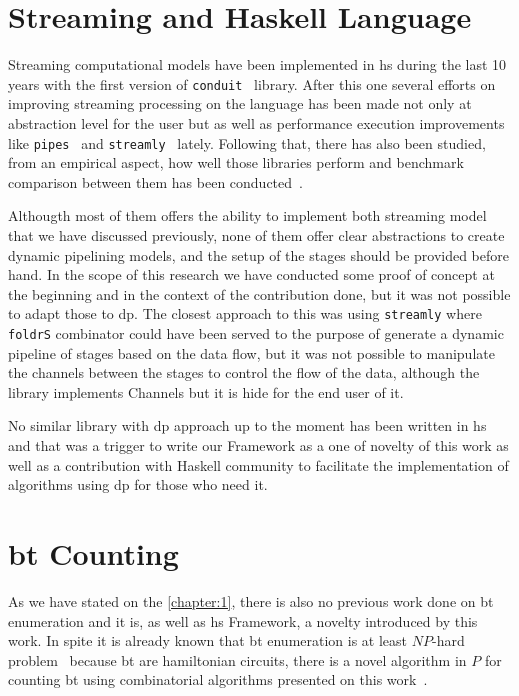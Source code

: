   

\section{Streaming and Haskell Language}
Streaming computational models have been implemented in \acrfull{hs} during the last 10 years with the first version of \texttt{conduit}~\cite{conduit} library.
After this one several efforts on improving streaming processing on the language has been made not only at abstraction level for the user but as well as performance execution 
improvements like \texttt{pipes}~\cite{pipes} and \texttt{streamly}~\cite{streamly} lately.
Following that, there has also been studied, from an empirical aspect, how well those libraries perform and benchmark comparison between them has been conducted~\cite{benchstreamhs}.

Althougth most of them offers the ability to implement both streaming model that we have discussed previously, none of them offer clear abstractions to create dynamic pipelining models, and
the setup of the stages should be provided before hand. In the scope of this research we have conducted some proof of concept at the beginning and in the context of the contribution done, 
but it was not possible to adapt those to \acrshort{dp}. The closest approach to this was using \texttt{streamly} where \texttt{foldrS} combinator
could have been served to the purpose of generate a dynamic pipeline of stages based on the data flow, but it was not possible to manipulate the channels between the stages to control the flow 
of the data, although the library implements Channels but it is hide for the end user of it.

No similar library with \acrshort{dp} approach up to the moment has been written in \acrlong{hs} and that was a trigger to write our Framework as a one of novelty of this work as well as a contribution
with Haskell community to facilitate the implementation of algorithms using \acrshort{dp} for those who need it.

\section{\acrlong{bt} Counting}
As we have stated on the \autoref{chapter:1}, there is also no previous work done on \acrshort{bt} enumeration and it is, as well as \acrshort{hs} Framework, a novelty introduced by this work.
In spite it is already known that \acrshort{bt} enumeration is at least $NP$-hard problem~\cite{hamilbipartite-np} because \acrshort{bt} are hamiltonian circuits, there is a novel algorithm in $P$ 
for counting \acrshort{bt} using combinatorial algorithms presented on this work~\cite{btcount}.

